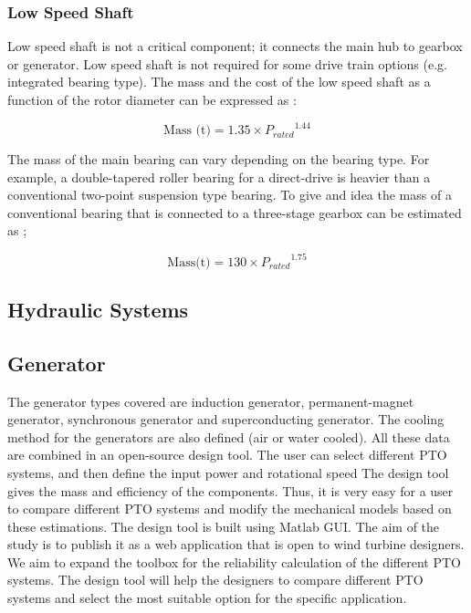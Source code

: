\documentclass{article}\usepackage{graphicx, color}
\begin{document}
\subsubsection{Low Speed Shaft}
Low speed shaft is not a critical component; it connects the main hub to gearbox or generator. Low speed shaft is not required for some drive train options (e.g. integrated bearing type). The mass and the cost of the low speed shaft as a function of the rotor diameter can be expressed as \cite{Fingersh2006}:

\begin{equation}
	\text{Mass (t)} = 1.35 \times {P_{rated}}^{1.44}
\end{equation}


The mass of the main bearing can vary depending on the bearing type. For example, a double-tapered roller bearing for a direct-drive is heavier than a conventional two-point suspension type bearing. To give and idea the mass of a conventional bearing that is connected to a three-stage gearbox can be estimated as \cite{Fingersh2006};

\begin{equation}
	\text{Mass(t)} = 130 \times {P_{rated}}^{1.75}
\end{equation}

\subsection{Hydraulic Systems}

\subsection{Generator}
The generator types covered are induction generator, permanent-magnet generator, synchronous generator and superconducting generator. The cooling method for the generators are also defined (air or water cooled). 
All these data are combined in an open-source design tool. The user can select different PTO systems, and then define the input power and rotational speed The design tool gives the mass and efficiency of the components. Thus, it is very easy for a user to compare different PTO systems and modify the mechanical models based on these estimations. The design tool is built using Matlab GUI. The aim of the study is to publish it as a web application that is open to wind turbine designers. We aim to expand the toolbox for the reliability calculation of the different PTO systems. The design tool will help the designers to compare different PTO systems and select the most suitable option for the specific application.
\end{document}
